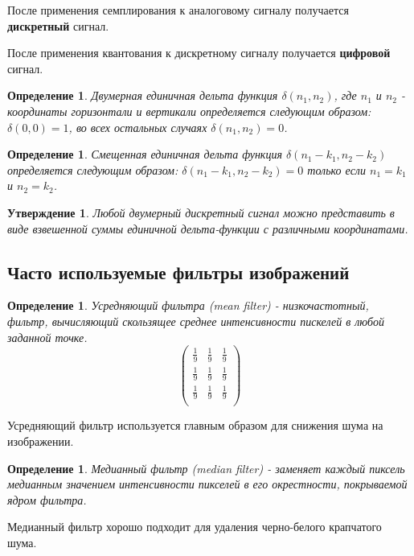 \documentclass[a4paper,12pt]{article}
\newtheorem{defn}[theorem]{Определение}
\newtheorem{statement}[theorem_1]{Утверждение}
\begin{document}
После применения семплирования к аналоговому сигналу получается \textbf{дискретный}
сигнал.

После применения квантования к дискретному сигналу получается \textbf{цифровой}
сигнал.

\begin{defn}
    Двумерная единичная дельта функция $\delta(n_1, n_2)$, где $n_1$ и $n_2$ - 
    координаты горизонтали и вертикали определяется следующим образом: 
    $\delta(0, 0) = 1$, во всех остальных случаях $\delta(n_1, n_2) = 0$.
\end{defn}
\begin{defn}
    Смещенная единичная дельта функция $\delta(n_1 - k_1, n_2 - k_2)$ определяется
    следующим образом: $\delta(n_1 - k_1, n_2 - k_2) = 0$ только если $n_1 = k_1$ и
     $n_2 = k_2$.
\end{defn}

\begin{statement}
    Любой двумерный дискретный сигнал можно представить в виде взвешенной суммы
    единичной дельта-функции с различными координатами.
\end{statement}

\subsection{Часто используемые фильтры изображений}%
\label{sub:часто_используемые_фильтры_изображений}
\begin{defn}
    Усредняющий фильтра (mean filter) - низкочастотный, фильтр, вычисляющий
    скользящее среднее интенсивности пискелей в любой заданной точке.
    $$\begin{pmatrix}
    \frac{1}{9} & \frac{1}{9} & \frac{1}{9} \\
    \frac{1}{9} & \frac{1}{9} & \frac{1}{9} \\
    \frac{1}{9} & \frac{1}{9} & \frac{1}{9} \\
\end{pmatrix}$$
\end{defn}
Усредняющий фильтр используется главным образом для снижения шума на изображении.

\begin{defn}
    Медианный фильтр (median filter) - заменяет каждый пиксель медианным значением
    интенсивности пикселей в его окрестности, покрываемой ядром фильтра.
\end{defn}
Медианный фильтр хорошо подходит для удаления черно-белого крапчатого шума.
\end{document}
